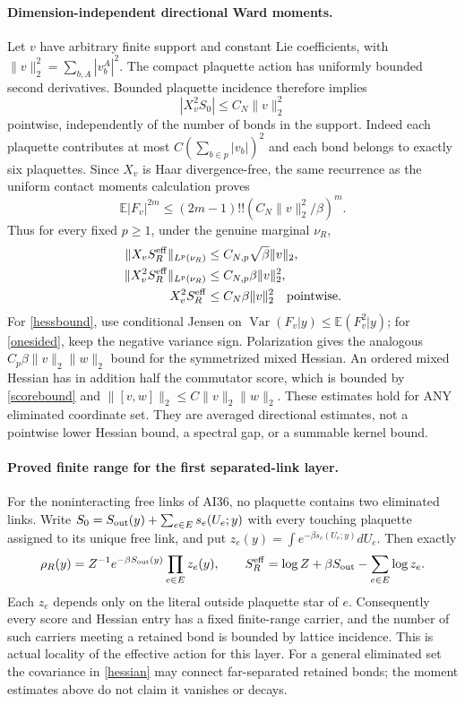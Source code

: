 \documentclass[11pt]{article}
\newcommand{\E}{\mathbb E}
\newcommand{\Var}{\operatorname{Var}}
\begin{document}
\paragraph{Dimension-independent directional Ward moments.}
Let $v$ have arbitrary finite support and constant Lie coefficients, with
$\|v\|_2^2=\sum_{b,A}|v_b^A|^2$. The compact plaquette action has uniformly bounded
second derivatives. Bounded plaquette incidence therefore implies
\[
 |X_v^2S_0|\le C_N\|v\|_2^2
\]
pointwise, independently of the number of bonds in the support.
Indeed each plaquette contributes at most $C(\sum_{b\in p}|v_b|)^2$ and each bond
belongs to exactly six plaquettes. Since $X_v$ is Haar divergence-free, the same recurrence
as the uniform contact moments calculation proves
\[
 \E|F_v|^{2m}\le(2m-1)!!(C_N\|v\|_2^2/\beta)^m.
\]
Thus for every fixed $p\ge1$, under the genuine marginal $\nu_R$,
\begin{align}
 \|X_vS_R^{\rm eff}\|_{L^p(\nu_R)}&\le C_{N,p}\sqrt\beta\|v\|_2,\label{scorebound}\\
 \|X_v^2S_R^{\rm eff}\|_{L^p(\nu_R)}&\le C_{N,p}\beta\|v\|_2^2,\label{hessbound}\\
 X_v^2S_R^{\rm eff}&\le C_N\beta\|v\|_2^2\quad\hbox{pointwise}.\label{onesided}
\end{align}
For \eqref{hessbound}, use conditional Jensen on $\Var(F_v|y)\le\E(F_v^2|y)$;
for \eqref{onesided}, keep the negative variance sign. Polarization gives the analogous
$C_p\beta\|v\|_2\|w\|_2$ bound for the symmetrized mixed Hessian.
An ordered mixed Hessian has in addition half the commutator score, which is bounded
by \eqref{scorebound} and $\|[v,w]\|_2\le C\|v\|_2\|w\|_2$.
These estimates hold for ANY eliminated coordinate set. They are averaged directional
estimates, not a pointwise lower Hessian bound, a spectral gap, or a summable kernel bound.

\paragraph{Proved finite range for the first separated-link layer.}
For the noninteracting free links of AI36, no plaquette contains two eliminated links.
Write $S_0=S_{\rm out}(y)+\sum_{e\in E}s_e(U_e;y)$ with every touching plaquette
assigned to its unique free link, and put
$z_e(y)=\int e^{-\beta s_e(U_e;y)}dU_e$. Then exactly
\[
 \rho_R(y)=Z^{-1}e^{-\beta S_{\rm out}(y)}\prod_{e\in E}z_e(y),\qquad
 S_R^{\rm eff}=\log Z+\beta S_{\rm out}-\sum_{e\in E}\log z_e.
\]
Each $z_e$ depends only on the literal outside plaquette star of $e$.
Consequently every score and Hessian entry has a fixed finite-range carrier, and the
number of such carriers meeting a retained bond is bounded by lattice incidence.
This is actual locality of the effective action for this layer. For a general eliminated
set the covariance in \eqref{hessian} may connect far-separated retained bonds; the
moment estimates above do not claim it vanishes or decays.
\end{document}
